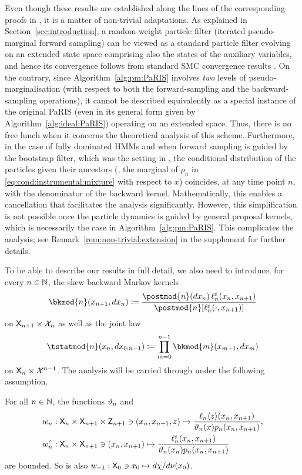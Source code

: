 Even though these results are established along the lines of the corresponding proofs in \cite{olsson:westerborn:2014b}, it is a matter of non-trivial adaptations. As explained in Section~\ref{sec:introduction}, a random-weight particle filter (iterated pseudo-marginal forward sampling) can be viewed as a standard particle filter evolving on an extended state space comprising also the states of the auxiliary variables, and hence its convergence follows from standard SMC convergence results \cite{fearnhead2008particle}. On the contrary, since Algorithm~\ref{alg:pm:PaRIS} involves \emph{two} levels of pseudo-marginalisation (with respect to both the forward-sampling and the backward-sampling operations), it cannot be described equivalently as a special instance of the original PaRIS (even in its general form given by Algorithm~\ref{alg:ideal:PaRIS}) operating on an extended space. Thus, there is no free lunch when it concerns the theoretical analysis of this scheme. Furthermore, in the case of fully dominated HMMs and when forward sampling is guided by the bootstrap filter, which was the setting in \cite{olsson:westerborn:2014b}, the conditional distribution of the particles given their ancestors (\ie, the marginal of $\rho_n$ in \eqref{eq:cond:instrumental:mixture} with respect to $x$) coincides, at any time point $n$, with the denominator of the backward kernel. Mathematically, this enables a cancellation that facilitates the analysis significantly. However, this simplification is not possible once the particle dynamics is guided by general proposal kernels, which is necessarily the case in Algorithm~\ref{alg:pm:PaRIS}. This complicates the analysis; see Remark~\ref{rem:non-trivial:extension} in the supplement for further details.

To be able to describe our results in full detail, we also need to introduce, for every $n \in \mathbb{N}$, the skew backward Markov kernels 
$$
    \bkmod{n}(x_{n + 1}, \rmd x_n) \eqdef \frac{\postmod{n}(\rmd x_n) \, \udmod{n}(x_n, x_{n + 1})}{\postmod{n}[\udmod{n}(\cdot, x_{n + 1})]}
$$
on $\mathsf{X}_{n + 1} \times \mathcal{X}_n$ as well as the joint law 
\begin{equation} \label{eq:skew:backward:law}
\tstatmod{n}(x_n, \rmd x_{0:n - 1}) \eqdef \prod_{m = 0}^{n - 1} \bkmod{m}(x_{m + 1}, \rmd x_m)
\end{equation}
on $\mathsf{X}_n \times \mathcal{X}^{n - 1}$. The analysis will be carried through under the following assumption.
\begin{hypH}
\label{assum:bound:filter:pseudomarginal}
For all $n \in \mathbb{N}$, the functions $\vartheta_{n}$ and  
\begin{align*}
&\wgtfuncext{n} : \Xset_n \times \Xset_{n + 1} \times \Zset_{n + 1} \ni (x_n, x_{n + 1}, z) \mapsto \frac{\ukest{n}{z}(x_n, x_{n + 1})}{\adjfuncforward{n}(x) \kissforward{n}{n}(x_n, x_{n + 1})}, \\
&\wgtfuncmod{n} : \Xset_n \times \Xset_{n + 1} \ni (x_n, x_{n + 1}) \mapsto \frac{\udmod{n}(x_n, x_{n + 1})}{\adjfuncforward{n}(x_n) \kissforward{n}{n}(x_n, x_{n + 1})}
\end{align*}
are bounded. So is also $w_{-1} : \mathsf{X}_0 \ni x_0 \mapsto d \chi / d \nu(x_0)$. 
\end{hypH}

